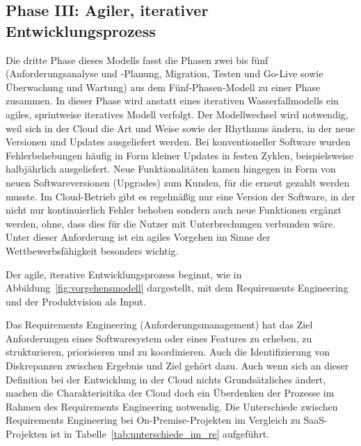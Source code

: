 \subsection{Phase III: Agiler, iterativer Entwicklungsprozess}
Die dritte Phase dieses Modells fasst die Phasen zwei bis fünf 
(Anforderungsanalyse und -Planung, Migration, Testen und Go-Live sowie 
Überwachung und Wartung) aus dem Fünf-Phasen-Modell zu einer Phase zusammen. In 
dieser Phase wird anstatt eines iterativen Wasserfallmodells ein agiles, 
sprintweise iteratives Modell verfolgt. Der Modellwechsel wird 
notwendig, weil sich in der Cloud die Art und Weise sowie der Rhythmus ändern, 
in der neue Versionen und Updates ausgeliefert werden. Bei konventioneller 
Software wurden Fehlerbehebungen häufig in Form kleiner Updates in festen 
Zyklen, beispielsweise halbjährlich ausgeliefert. Neue Funktionalitäten kamen 
hingegen in Form von neuen Softwareversionen (Upgrades) zum Kunden, für die 
erneut gezahlt werden musste. Im Cloud-Betrieb gibt es regelmäßig  nur eine 
Version der Software, in der nicht nur kontinuierlich Fehler behoben 
sondern auch neue Funktionen ergänzt werden, ohne, dass dies für die Nutzer mit 
Unterbrechungen verbunden wäre. 
 Unter 
dieser Anforderung ist ein agiles Vorgehen im Sinne der Wettbewerbsfähigkeit 
besonders wichtig.

Der agile, iterative Entwicklungsprozess beginnt, wie in 
Abbildung~\ref{fig:vorgehensmodell} dargestellt, mit dem Requirements 
Engineering und der Produktvision als Input.

Das Requirements Engineering (Anforderungsmanagement) hat das Ziel 
Anforderungen eines Softwaresystem oder eines Features zu erheben, zu 
strukturieren, priorisieren und zu 
koordinieren.  Auch die 
Identifizierung von Diskrepanzen zwischen Ergebnis und Ziel gehört dazu. 
 Auch wenn sich 
an dieser Definition bei der Entwicklung in der Cloud nichts Grundsätzliches 
ändert, machen die Charakterisitika der Cloud doch ein Überdenken der Prozesse 
im Rahmen des Requirements Engineering notwendig. 
Die Unterschiede zwischen Requirements Engineering bei On-Premise-Projekten im 
Vergleich zu SaaS-Projekten ist in Tabelle~\ref{tab:unterschiede_im_re} 
aufgeführt.


